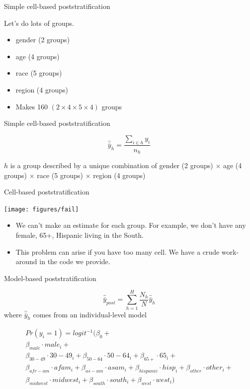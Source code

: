 \documentclass[aspectratio=169]{beamer}
\begin{document}
\begin{frame}{Simple cell-based poststratification}

Let's do lots of groups.
\begin{itemize}
\item gender (2 groups)
\item age (4 groups)
\item race (5 groups)
\item region (4 groups)
\item Makes 160 $(2 \times 4 \times 5 \times 4)$ groups
\end{itemize}

\end{frame}
\begin{frame}{Simple cell-based poststratification}

\begin{equation*}
\hat{\bar{y}}_h = \frac{\sum_{i \in h} y_i}{n_h}
\end{equation*}

\vfill
$h$ is a group described by a unique combination of gender (2 groups) $\times$ age (4 groups) $\times$ race (5 groups) $\times$ region (4 groups) 

\end{frame}
\begin{frame}{Cell-based poststratification}

\begin{center}
\texttt{[image: figures/fail]}
\end{center}

\vfill

\begin{itemize}
\item We can't make an estimate for each group.  For example, we don't have any female, 65+, Hispanic living in the South. \pause
\item This problem can arise if you have too many cell.  We have a crude work-around in the code we provide. 
\end{itemize}

\end{frame}
\begin{frame}{Model-based poststratification}

\begin{equation*}
\hat{\bar{y}}_{post} = \sum_{h=1}^H \frac{N_h}{N} \hat{\bar{y}}_h
\end{equation*}
where
$\hat{\bar{y}}_h$ comes from an individual-level model

\begin{align*}
Pr(y_i = 1) = logit^{-1} (\beta_0 + \\
 \beta_{male} \cdot male_i+ \\
 \beta_{30-49} \cdot 30-49_i + \beta_{50 - 64} \cdot 50-64_i+ \beta_{65+} \cdot 65_i +\\
 \beta_{afr-am} \cdot afam_i + \beta_{as-am} \cdot asam_i+ \beta_{hispanic} \cdot hisp_i + \beta_{other} \cdot other_i + \\
 \beta_{midwest} \cdot midwest_i + \beta_{south} \cdot south_i + \beta_{west} \cdot west_i)
\end{align*}

\end{frame}
\end{document}
